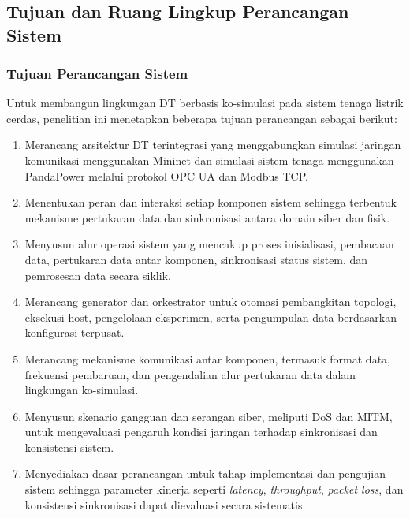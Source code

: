 \chapter{\babTiga}
\label{cha:perancangansistem}

\section{Tujuan dan Ruang Lingkup Perancangan Sistem}
\label{sec:tujuan_ruang_lingkup_perancangan_sistem}

\subsection{Tujuan Perancangan Sistem}
\label{subsec:tujuan_perancangan_sistem}
Untuk membangun lingkungan \ac{DT} berbasis ko-simulasi pada sistem tenaga listrik cerdas, penelitian ini menetapkan beberapa tujuan perancangan sebagai berikut:

\begin{enumerate}
    \item Merancang arsitektur \ac{DT} terintegrasi yang menggabungkan simulasi jaringan komunikasi menggunakan Mininet dan simulasi sistem tenaga menggunakan PandaPower melalui protokol OPC UA dan Modbus TCP.

    \item Menentukan peran dan interaksi setiap komponen sistem sehingga terbentuk mekanisme pertukaran data dan sinkronisasi antara domain siber dan fisik.

    \item Menyusun alur operasi sistem yang mencakup proses inisialisasi, pembacaan data, pertukaran data antar komponen, sinkronisasi status sistem, dan pemrosesan data secara siklik.

    \item Merancang generator dan orkestrator untuk otomasi pembangkitan topologi, eksekusi host, pengelolaan eksperimen, serta pengumpulan data berdasarkan konfigurasi terpusat.

    \item Merancang mekanisme komunikasi antar komponen, termasuk format data, frekuensi pembaruan, dan pengendalian alur pertukaran data dalam lingkungan ko-simulasi.

    \item Menyusun skenario gangguan dan serangan siber, meliputi \ac{DoS} dan \ac{MITM}, untuk mengevaluasi pengaruh kondisi jaringan terhadap sinkronisasi dan konsistensi sistem.

    \item Menyediakan dasar perancangan untuk tahap implementasi dan pengujian sistem sehingga parameter kinerja seperti \textit{latency}, \textit{throughput}, \textit{packet loss}, dan konsistensi sinkronisasi dapat dievaluasi secara sistematis.
\end{enumerate}

